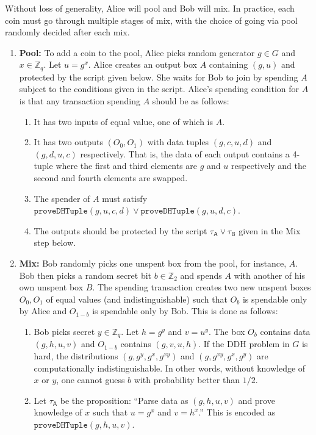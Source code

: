 \documentclass[11pt]{article}
\begin{document}
Without loss of generality, Alice will pool and Bob will mix. In practice, each coin must go through multiple stages of mix, with the choice of going via pool randomly decided after each mix.

\begin{enumerate}
	\item \textbf{Pool:} To add a coin to the pool, Alice picks random generator $g\in G$ and $x\in \mathbb{Z}_q$. Let $u = g^{x}$. Alice creates an output box $A$ containing $(g, u)$ and protected by the script given below. She waits for Bob to join by spending $A$ subject to the conditions given in the script. 
	Alice's spending condition for $A$ is that any transaction spending $A$ should be as follows: 
	
	\begin{enumerate}
		\item It has two inputs of equal value, one of which is $A$. %
		\item It has two outputs $(O_0, O_1)$ with data tuples $(g, c, u, d)$ and $(g, d, u, c)$ respectively. That is, the data of each output contains a 4-tuple where the first and third elements are $g$ and $u$ respectively and the second and fourth elements are swapped. 
		\item The spender of $A$ must satisfy $\texttt{proveDHTuple}(g, u, c, d)\lor \texttt{proveDHTuple}(g, u, d, c)$.
		\item The outputs should be protected by the script $\tau_\textsf{A} \lor \tau_\textsf{B}$ given in the Mix step below.
	\end{enumerate}
	
	
	\item \textbf{Mix:} Bob randomly picks one unspent box from the pool, for instance, $A$. Bob then picks a random secret bit $b \in \mathbb{Z}_2$ and spends $A$ with another of his own unspent box $B$. The spending transaction creates two new unspent boxes $O_0, O_1$ of equal values (and indistinguishable) such that $O_b$ is spendable only by Alice and $O_{1-b}$ is spendable only by Bob. This is done as follows:
	
	\begin{enumerate}
		\item Bob picks secret $y\in \mathbb{Z}_q$. Let $h = {g}^{y}$ and $v = {u}^{y}$.  %
		The box $O_b$ contains data $(g, h, u, v)$ and $O_{1-b}$ contains $(g, v, u, h)$. If the DDH problem in $G$ is hard, the distributions $(g, {g}^{y}, {g}^{x}, {g}^{xy})$ and 
		$(g, {g}^{xy}, {g}^{x}, {g}^{y})$ are computationally indistinguishable. In other words, without knowledge of $x$ or $y$, one cannot guess $b$ with probability better than $1/2$.
		\item  Let 
		$\tau_\textsf{A}$ be the proposition: ``Parse data as $(g, h, u, v)$ and
		prove knowledge of $x$ such that $u = {g}^{x}$ and ${v} = {h}^{x}$.'' This is encoded as $\texttt{proveDHTuple}(g, h, u, v)$.
		

\end{enumerate}
\end{enumerate}
\end{document}
